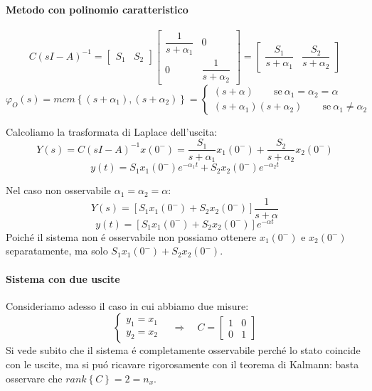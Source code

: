 \documentclass[../main.tex]{subfiles}
\begin{document}
\begin{Exercise}[title={Studiare l'osservabilit\'a di due vasche in parallelo}]
			\paragraph{Metodo con polinomio caratteristico}
				\[
					C(sI-A)^{-1} =
					\begin{bmatrix}
						S_1 & S_2
					\end{bmatrix}
					\begin{bmatrix}
						\dfrac{1}{s+\alpha_1} & 0\\
						0 & \dfrac{1}{s+\alpha_2}
					\end{bmatrix} =
					\begin{bmatrix}
						\dfrac{S_1}{s+\alpha_1} & \dfrac{S_2}{s+\alpha_2}
					\end{bmatrix}
				\]
				\[
					\varphi_O(s) = mcm\left\lbrace (s+\alpha_1), (s+\alpha_2) \right\rbrace =
					\begin{cases}
						(s+\alpha) \qquad\text{se}\ \alpha_1 = \alpha_2 = \alpha\\
						(s+\alpha_1)(s+\alpha_2) \qquad\text{se}\ \alpha_1 \neq \alpha_2
					\end{cases}
				\]
				
				Calcoliamo la trasformata di Laplace dell'uscita:
				\[
					Y(s) = C(sI-A)^{-1} x(0^{-}) = \dfrac{S_1}{s+\alpha_1}x_1(0^{-}) + \dfrac{S_2}{s+\alpha_2}x_2(0^{-})
				\]
				\[
					y(t) = S_1x_1(0^{-}) e^{-\alpha_1 t} + S_2x_2(0^{-}) e^{-\alpha_2 t}
				\]
				
				Nel caso non osservabile $ \alpha_1 = \alpha_2 = \alpha $:
				\[
					Y(s) = [S_1 x_1(0^{-}) + S_2 x_2(0^{-})] \dfrac{1}{s+\alpha}
				\]
				\[
					y(t) = [S_1 x_1(0^{-}) + S_2 x_2(0^{-})] e^{-\alpha t}
				\]
				Poich\'e il sistema non \'e osservabile non possiamo ottenere $ x_1(0^{-}) $ e $ x_2(0^{-}) $ separatamente, ma solo $ S_1 x_1(0^{-}) + S_2 x_2(0^{-}) $.
			
			\paragraph{Sistema con due uscite}
				Consideriamo adesso il caso in cui abbiamo due misure:
				\[
					\begin{cases}
						y_1 = x_1\\
						y_2 = x_2
					\end{cases}
					\quad\Rightarrow\quad
					C =
					\begin{bmatrix}
						1 & 0\\
						0 & 1
					\end{bmatrix}
				\]
				Si vede subito che il sistema \'e completamente osservabile perch\'e lo stato coincide con le uscite, ma si pu\'o ricavare rigorosamente con il teorema di Kalmann: basta osservare che $ rank\left\lbrace C \right\rbrace = 2 = n_x $.
				

\end{Exercise}
\end{document}

